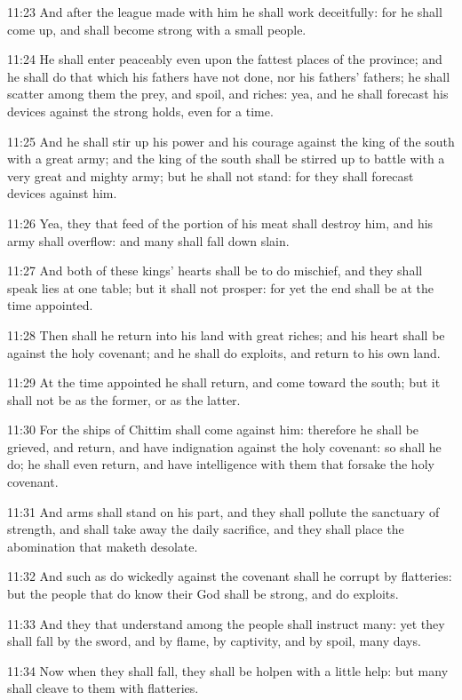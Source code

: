 11:23 And after the league made with him he shall work deceitfully:
for he shall come up, and shall become strong with a small people.

11:24 He shall enter peaceably even upon the fattest places of the
province; and he shall do that which his fathers have not done, nor
his fathers' fathers; he shall scatter among them the prey, and spoil,
and riches: yea, and he shall forecast his devices against the strong
holds, even for a time.

11:25 And he shall stir up his power and his courage against the king
of the south with a great army; and the king of the south shall be
stirred up to battle with a very great and mighty army; but he shall
not stand: for they shall forecast devices against him.

11:26 Yea, they that feed of the portion of his meat shall destroy
him, and his army shall overflow: and many shall fall down slain.

11:27 And both of these kings' hearts shall be to do mischief, and
they shall speak lies at one table; but it shall not prosper: for yet
the end shall be at the time appointed.

11:28 Then shall he return into his land with great riches; and his
heart shall be against the holy covenant; and he shall do exploits,
and return to his own land.

11:29 At the time appointed he shall return, and come toward the
south; but it shall not be as the former, or as the latter.

11:30 For the ships of Chittim shall come against him: therefore he
shall be grieved, and return, and have indignation against the holy
covenant: so shall he do; he shall even return, and have intelligence
with them that forsake the holy covenant.

11:31 And arms shall stand on his part, and they shall pollute the
sanctuary of strength, and shall take away the daily sacrifice, and
they shall place the abomination that maketh desolate.

11:32 And such as do wickedly against the covenant shall he corrupt by
flatteries: but the people that do know their God shall be strong, and
do exploits.

11:33 And they that understand among the people shall instruct many:
yet they shall fall by the sword, and by flame, by captivity, and by
spoil, many days.

11:34 Now when they shall fall, they shall be holpen with a little
help: but many shall cleave to them with flatteries.

